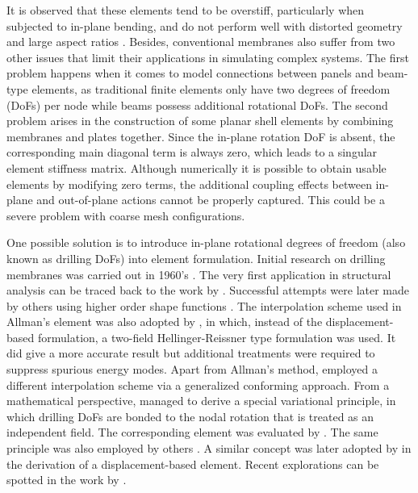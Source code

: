 \documentclass[3p,sort&compress,review,11pt]{elsarticle}
\begin{document}
It is observed that these elements tend to be overstiff, particularly when subjected to in-plane bending, and do not perform well with distorted geometry and large aspect ratios  \citep{Pian1984,Bergan1985}. Besides, conventional membranes also suffer from two other issues that limit their applications in simulating complex systems. The first problem happens when it comes to model connections between panels and beam-type elements, as traditional finite elements only have two degrees of freedom (DoFs) per node while beams possess additional rotational DoFs. The second problem arises in the construction of some planar shell elements by combining membranes and plates together. Since the in-plane rotation DoF is absent, the corresponding main diagonal term is always zero, which leads to a singular element stiffness matrix. Although numerically it is possible to obtain usable elements by modifying zero terms, the additional coupling effects between in-plane and out-of-plane actions cannot be properly captured. This could be a severe problem with coarse mesh configurations.

One possible solution is to introduce in-plane rotational degrees of freedom (also known as drilling DoFs) into element formulation. Initial research on drilling membranes was carried out in 1960's \citep{Felippa1966,Scordelis1967,Willam1969}. The very first application in structural analysis can be traced back to the work by \citet{MacLeod1969}. Successful attempts were later made by others using higher order shape functions \citep{Allman1984,Allman1988,Bergan1985,Cook1986,MacNeal1988}. The interpolation scheme used in Allman's element was also adopted by \citet{Sze1992}, in which, instead of the displacement-based formulation, a two-field Hellinger-Reissner type formulation was used. It did give a more accurate result but additional treatments were required to suppress spurious energy modes. Apart from Allman's method, \citet{Long1994} employed a different interpolation scheme via a generalized conforming approach. From a mathematical perspective, \citet{Hughes1989} managed to derive a special variational principle, in which drilling DoFs are bonded to the nodal rotation that is treated as an independent field. The corresponding element was evaluated by \citet{Hughes1995}. The same principle was also employed by others \citep{Ibrahimbegovic1990,Ibrahimbegovic1992,Ibrahimbegovic1993,Ibrahimbegovic1994,Chinosi1997}. A similar concept was later adopted by \citet{Choi2002} in the derivation of a displacement-based element. Recent explorations can be spotted in the work by \citet{Fajman2002,Cen2011,Cen2015,Madeo2012,Madeo2014,Shang2017}.
\end{document}
